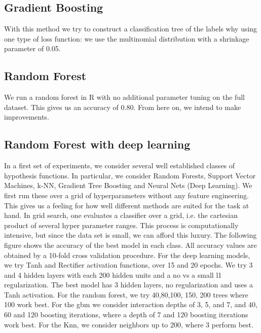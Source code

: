 \documentclass[paper=a4, fontsize=11pt]{scrartcl}
\numberwithin{equation}{section}
\numberwithin{figure}{section}
\numberwithin{table}{section}
\begin{document}


\subsection{Gradient Boosting}
With this method we try to construct a classification tree of the labels why using one type of loss function: we use the multinomial distribution with a shrinkage parameter of 0.05.  



\subsection{Random Forest}
 We run a random forest in R with no additional parameter tuning on the full dataset. This gives us an accuracy of 0.80. From here on, we intend to make improvements.


\subsection{Random Forest with deep learning}

In a first set of experiments, we consider several well established classes of hypothesis functions. In particular, we consider Random Forests, Support Vector Machines, k-NN,  Gradient Tree Boosting and Neural Nets (Deep Learning). 
We first run these over a grid of hyperparameters without any feature engineering. This gives us a feeling for how well different methods are suited for the task at hand. In grid search, one evaluates a classifier over a grid, i.e. the cartesian product of several hyper parameter ranges. This process is computationally intensive, but since the data set is small, we can afford this luxury. The following figure shows the accuracy of the best model in each class. All accuracy values are obtained by a 10-fold cross validation procedure. 
For the deep learning models, we try Tanh and Rectifier activation functions, over 15 and 20 epochs. We try 3 and 4 hidden layers with each 200 hidden units and a no vs a small l1 regularization. The best model has 3 hidden layers, no regularization and uses a Tanh activation. For the random forest, we try 40,80,100, 150, 200 trees where 100 work best. For the gbm we consider interaction depths of 3, 5, and 7, and 40, 60 and 120 boosting iterations, where a depth of 7 and 120 boosting iterations work best. For the Knn, we consider neighbors up to 200, where 3 perform best. 
\end{document}
